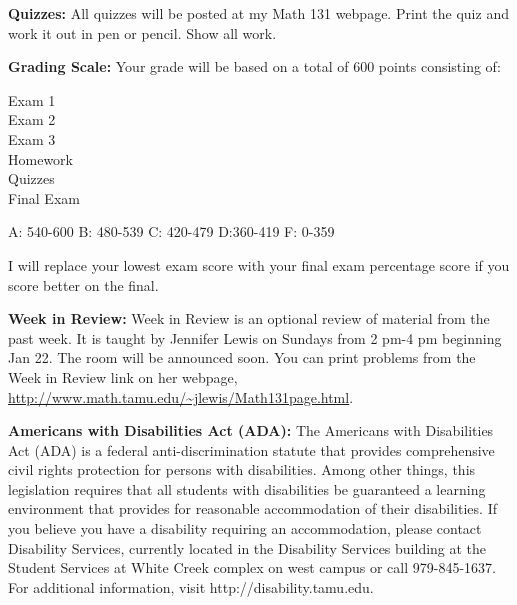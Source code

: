 \documentclass[12pt]{article}
\begin{document}
\vspace*{.15in}
\noindent\textbf{Quizzes:} All quizzes will be posted at my Math 131 webpage. Print the quiz and work it out in pen or pencil. Show all work.

\vspace*{.15in}
\noindent\textbf{Grading Scale:} Your grade will be based on a total of 600 points consisting of: \\
\begin{center}
\begin{minipage}{3in}
\begin{flushleft}
Exam 1    \\
Exam 2    \\
Exam 3      \\
Homework     \\
Quizzes      \\
Final Exam   \\
\end{flushleft}
\end{minipage} 
\end{center}

\begin{center}
A: 540-600  \qquad    B: 480-539  \qquad   C: 420-479   \qquad    D:360-419 \qquad F: 0-359     
\end{center}

I will replace your lowest exam score with your final exam percentage score if you score better on the final.

 
\vspace*{.15in}
\noindent \textbf{Week in Review:} Week in Review is an optional review of material from the past week. It is taught by Jennifer Lewis on Sundays from 2 pm-4 pm beginning Jan 22. The room will be announced soon.  You can print problems from the Week in Review link on her webpage, \url{http://www.math.tamu.edu/~jlewis/Math131page.html}. 
     
\vspace*{.15in}

\noindent \textbf{Americans with Disabilities Act (ADA):} The Americans with Disabilities Act (ADA) is a federal anti-discrimination statute that provides comprehensive civil rights protection for persons with disabilities. Among other things, this legislation requires that all students with disabilities be guaranteed a learning environment that provides for reasonable accommodation of their disabilities. If you believe you have a disability requiring an accommodation, please contact Disability Services, currently located in the Disability Services building at the Student Services at White Creek complex on west campus or call 979-845-1637. For additional information, visit http://disability.tamu.edu.
\end{document}
